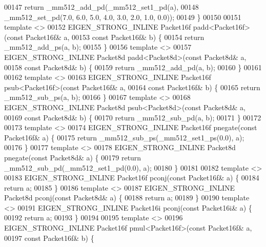 \begin{DoxyCode}
00147   \textcolor{keywordflow}{return} \_mm512\_add\_pd(\_mm512\_set1\_pd(a),
00148                        \_mm512\_set\_pd(7.0, 6.0, 5.0, 4.0, 3.0, 2.0, 1.0, 0.0));
00149 \}
00150 
00151 \textcolor{keyword}{template} <>
00152 EIGEN\_STRONG\_INLINE Packet16f padd<Packet16f>(\textcolor{keyword}{const} Packet16f& a,
00153                                               \textcolor{keyword}{const} Packet16f& b) \{
00154   \textcolor{keywordflow}{return} \_mm512\_add\_ps(a, b);
00155 \}
00156 \textcolor{keyword}{template} <>
00157 EIGEN\_STRONG\_INLINE Packet8d padd<Packet8d>(\textcolor{keyword}{const} Packet8d& a,
00158                                             \textcolor{keyword}{const} Packet8d& b) \{
00159   \textcolor{keywordflow}{return} \_mm512\_add\_pd(a, b);
00160 \}
00161 
00162 \textcolor{keyword}{template} <>
00163 EIGEN\_STRONG\_INLINE Packet16f psub<Packet16f>(\textcolor{keyword}{const} Packet16f& a,
00164                                               \textcolor{keyword}{const} Packet16f& b) \{
00165   \textcolor{keywordflow}{return} \_mm512\_sub\_ps(a, b);
00166 \}
00167 \textcolor{keyword}{template} <>
00168 EIGEN\_STRONG\_INLINE Packet8d psub<Packet8d>(\textcolor{keyword}{const} Packet8d& a,
00169                                             \textcolor{keyword}{const} Packet8d& b) \{
00170   \textcolor{keywordflow}{return} \_mm512\_sub\_pd(a, b);
00171 \}
00172 
00173 \textcolor{keyword}{template} <>
00174 EIGEN\_STRONG\_INLINE Packet16f pnegate(\textcolor{keyword}{const} Packet16f& a) \{
00175   \textcolor{keywordflow}{return} \_mm512\_sub\_ps(\_mm512\_set1\_ps(0.0), a);
00176 \}
00177 \textcolor{keyword}{template} <>
00178 EIGEN\_STRONG\_INLINE Packet8d pnegate(\textcolor{keyword}{const} Packet8d& a) \{
00179   \textcolor{keywordflow}{return} \_mm512\_sub\_pd(\_mm512\_set1\_pd(0.0), a);
00180 \}
00181 
00182 \textcolor{keyword}{template} <>
00183 EIGEN\_STRONG\_INLINE Packet16f pconj(\textcolor{keyword}{const} Packet16f& a) \{
00184   \textcolor{keywordflow}{return} a;
00185 \}
00186 \textcolor{keyword}{template} <>
00187 EIGEN\_STRONG\_INLINE Packet8d pconj(\textcolor{keyword}{const} Packet8d& a) \{
00188   \textcolor{keywordflow}{return} a;
00189 \}
00190 \textcolor{keyword}{template} <>
00191 EIGEN\_STRONG\_INLINE Packet16i pconj(\textcolor{keyword}{const} Packet16i& a) \{
00192   \textcolor{keywordflow}{return} a;
00193 \}
00194 
00195 \textcolor{keyword}{template} <>
00196 EIGEN\_STRONG\_INLINE Packet16f pmul<Packet16f>(\textcolor{keyword}{const} Packet16f& a,
00197                                               \textcolor{keyword}{const} Packet16f& b) \{

\end{DoxyCode}

